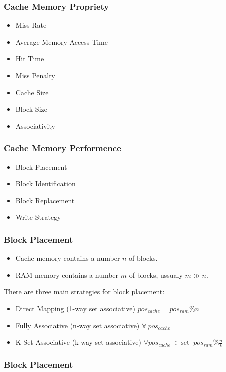 \begin{frame}
    \frametitle{Cache Memory Propriety}
    \begin{itemize}
        \item Miss Rate
        \item Average Memory Access Time
        \item Hit Time
        \item Miss Penalty
        \item Cache Size
        \item Block Size
        \item Associativity
    \end{itemize}
\end{frame}

\begin{frame}
    \frametitle{Cache Memory Performence}
    \begin{itemize}
        \item Block Placement
        \item Block Identification
        \item Block Replacement
        \item Write Strategy
    \end{itemize}
\end{frame}

\begin{frame}
    \frametitle{Block Placement}
    \begin{itemize}
        \item Cache memory contains a number $n$ of blocks.
        \item RAM memory contains a number $m$ of blocks, ussualy $m \gg n$.
    \end{itemize}
    There are three main strategies for block placement:
    \begin{itemize}
        \item Direct Mapping (1-way set associative) $pos_{cache}=pos_{ram} \% n$
        \item Fully Associative (n-way set associative) $ \forall \ pos_{cache}$
        \item K-Set Associative (k-way set associative) $\forall pos_{cache} \ \in \text{set } \ pos_{ram} \% \frac{n}{k}$
    \end{itemize}
\end{frame}

\begin{frame}
    \frametitle{Block Placement}
\end{frame}

